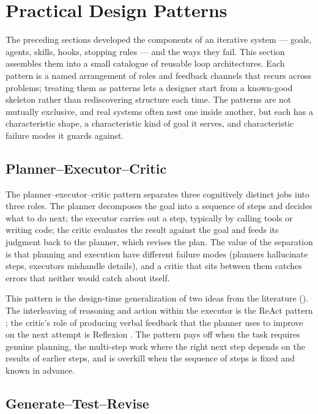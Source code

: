 \section{Practical Design Patterns}\label{sec:design-patterns}

The preceding sections developed the components of an iterative system --- goals,
agents, skills, hooks, stopping rules --- and the ways they fail. This section
assembles them into a small catalogue of reusable loop architectures. Each
pattern is a named arrangement of roles and feedback channels that recurs across
problems; treating them as patterns lets a designer start from a known-good
skeleton rather than rediscovering structure each time. The patterns are not
mutually exclusive, and real systems often nest one inside another, but each has
a characteristic shape, a characteristic kind of goal it serves, and
characteristic failure modes it guards against.

\subsection{Planner--Executor--Critic}\label{subsec:pattern-planner-executor-critic}

The planner--executor--critic pattern separates three cognitively distinct jobs
into three roles. The planner decomposes the goal into a sequence of steps and
decides what to do next; the executor carries out a step, typically by calling
tools or writing code; the critic evaluates the result against the goal and feeds
its judgment back to the planner, which revises the plan. The value of the
separation is that planning and execution have different failure modes (planners
hallucinate steps, executors mishandle details), and a critic that
sits between them catches errors that neither would catch about itself.

This pattern is the design-time generalization of two ideas from the literature
(). The interleaving of reasoning and action
within the executor is the ReAct pattern \citep{yao2022react}; the critic's role
of producing verbal feedback that the planner uses to improve on the next attempt
is Reflexion \citep{shinn2023reflexion}. The pattern pays off
when the task requires genuine planning, the multi-step work where the right next
step depends on the results of earlier steps, and is overkill when the
sequence of steps is fixed and known in advance.

\subsection{Generate--Test--Revise}\label{subsec:pattern-generate-test-revise}

